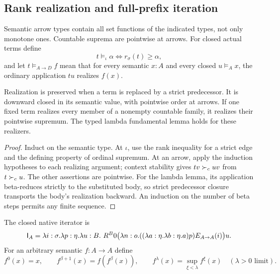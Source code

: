 \subsection{Rank realization and full-prefix iteration}
Semantic arrow types contain all set functions of the indicated types,
not only monotone ones. Countable suprema are pointwise at arrows.
For closed actual terms define
\[
 t\models_\iota\alpha\iff r_\sigma(t)\ge\alpha,
\]
and let $t\models_{A\to D}f$ mean that for every semantic $x:A$
and every closed $u\models_A x$, the ordinary application $tu$
realizes $f(x)$.

\begin{lemma}\label{lem:realization}
Realization is preserved when a term is replaced by a strict predecessor.
It is downward closed in its semantic value, with pointwise order at
arrows. If one fixed term realizes every member of a nonempty countable
family, it realizes their pointwise supremum. The typed lambda
fundamental lemma holds for these realizers.
\end{lemma}
\begin{proof}
Induct on the semantic type. At $\iota$, use the rank inequality
for a strict edge and the defining property of ordinal supremum.
At an arrow, apply the induction hypotheses to each realizing
argument; context stability gives $tv\succ_c uv$ from $t\succ_c u$.
The other assertions are pointwise. For the lambda lemma, its
application beta-reduces strictly to the substituted body, so strict
predecessor closure transports the body's realization backward.
An induction on the number of beta steps permits any finite sequence.
\end{proof}

The closed native iterator is
\[
 \mathsf I_A=\lambda i:\sigma.\lambda p:\eta.\lambda u:B.\
 R^B0\bigl(\lambda n:o.((\lambda a:\eta.\lambda b:\eta.a)p)
                   E_{A\to A}(i)\bigr)u.
\]
For an arbitrary semantic $f:A\to A$ define
\[
 f^0(x)=x,\qquad
 f^{\beta+1}(x)=f(f^\beta(x)),\qquad
 f^\lambda(x)=\sup_{\xi<\lambda} f^\xi(x)
 \quad(\lambda>0\text{ limit}).
 \tag{I}
\]

